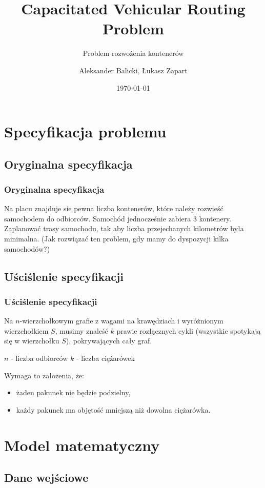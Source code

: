 \documentclass{beamer}
\title{Capacitated Vehicular Routing Problem}
\subtitle{Problem rozwożenia kontenerów}
\author{Aleksander Balicki, Łukasz Zapart}
\institute{Instytut Informatyki}
\date{\today}
\begin{document}
\mode*
\begin{frame}
\titlepage
\end{frame}

\begin{frame}
\tableofcontents[hideallsubsections]
\end{frame}


\section{Specyfikacja problemu}

\begin{frame}
\subsection{Oryginalna specyfikacja}
\frametitle{Oryginalna specyfikacja}
	Na placu znajduje sie pewna liczba kontenerów, które należy rozwieść samochodem do odbiorców. Samochód jednocześnie zabiera 3 kontenery. Zaplanować trasy samochodu, tak aby liczba przejechanych kilometrów była minimalna. (Jak rozwiązać ten problem, gdy mamy do dyspozycji kilka samochodów?)
\end{frame}

\begin{frame}
\subsection{Uściślenie specyfikacji}
\frametitle{Uściślenie specyfikacji}
	Na $n$-wierzchołkowym grafie z wagami na krawędziach i wyróżnionym wierzchołkiem $S$, musimy znaleść $k$ prawie rozłącznych cykli (wszystkie spotykają się w wierzchołku $S$), pokrywających cały graf.

	$n$ - liczba odbiorców
	$k$ - liczba ciężarówek

	Wymaga to założenia, że:
	\begin{itemize}
		\item żaden pakunek nie będzie podzielny,
		\item każdy pakunek ma objętość mniejszą niż dowolna ciężarówka.
	\end{itemize}
\end{frame}

\section{Model matematyczny}
\subsection{Dane wejściowe}
\end{document}
